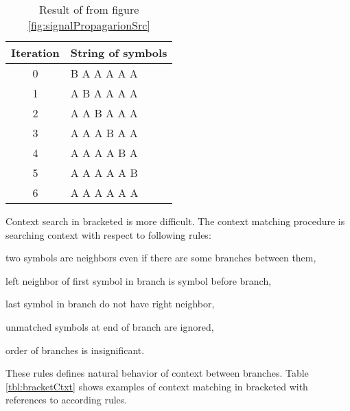 \begin{table}[ht]
	\centering
	\begin{tabular}{c l}
   		\toprule
   		Iteration & String of symbols \\
   		\midrule
		0 & B A A A A A \\
		1 & A B A A A A \\
		2 & A A B A A A \\
		3 & A A A B A A \\
		4 & A A A A B A \\
		5 & A A A A A B \\
		6 & A A A A A A \\
		\bottomrule
	\end{tabular}
	\caption{Result of \lsystem from figure \ref{fig:signalPropagarionSrc}}
	\label{fig:signalPropagarion}
\end{table}

Context search in bracketed \lsystems is more difficult.
The context matching procedure is searching context with respect to following rules:
\begin{enumerate*}
	\item \label{enum:ctxRule1} two symbols are neighbors even if there are some branches between them,
	\item \label{enum:ctxRule2} left neighbor of first symbol in branch is symbol before branch,
	\item \label{enum:ctxRule3} last symbol in branch do not have right neighbor,
	\item \label{enum:ctxRule4} unmatched symbols at end of branch are ignored,
	\item \label{enum:ctxRule5} order of branches is insignificant.
\end{enumerate*}

These rules defines natural behavior of context between branches.
Table \ref{tbl:bracketCtxt} shows examples of context matching in bracketed \lsystems with references to according rules.

